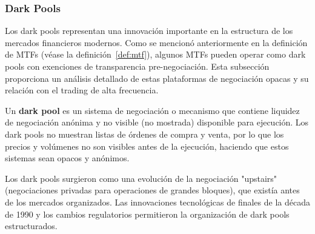 \subsubsection{Dark Pools}
\label{subsec:darkpools}

Los dark pools representan una innovación importante en la estructura de los mercados financieros modernos. Como se mencionó anteriormente en la definición de MTFs (véase la definición~\ref{def:mtf}), algunos MTFs pueden operar como dark pools con exenciones de transparencia pre-negociación. Esta subsección proporciona un análisis detallado de estas plataformas de negociación opacas y su relación con el trading de alta frecuencia.

\begin{definicion}
Un \textbf{dark pool} es un sistema de negociación o mecanismo que contiene liquidez de negociación anónima y no visible (no mostrada) disponible para ejecución. Los dark pools no muestran listas de órdenes de compra y venta, por lo que los precios y volúmenes no son visibles antes de la ejecución, haciendo que estos sistemas sean opacos y anónimos.
\end{definicion}

Los dark pools surgieron como una evolución de la negociación "upstairs" (negociaciones privadas para operaciones de grandes bloques), que existía antes de los mercados organizados. Las innovaciones tecnológicas de finales de la década de 1990 y los cambios regulatorios permitieron la organización de dark pools estructurados.

